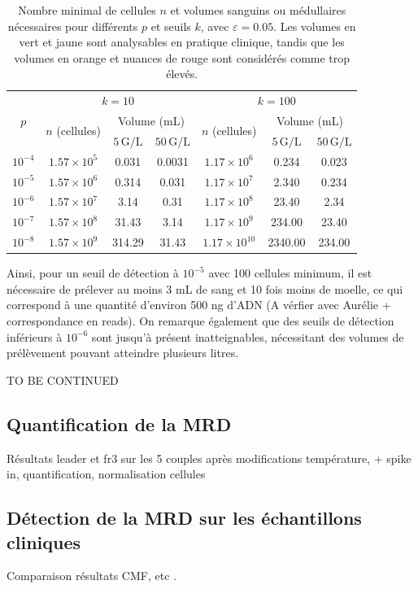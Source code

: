 \begin{table}[H]
    \centering
    \caption{
        Nombre minimal de cellules $n$ et volumes sanguins ou médullaires nécessaires pour différents $p$ et seuils $k$, avec $\varepsilon = 0.05$.
        Les volumes en \colorbox{mygreen}{vert} et \colorbox{myyellow}{jaune} sont analysables en pratique clinique, tandis que les
        volumes en \colorbox{myorange}{orange} et nuances de \colorbox{myred}{rouge} sont considérés comme trop élevés.
    }
    \label{tab:valeurs_n_volume}
    \begin{tabular}{c|c|cc|c|cc}
        \toprule
        \multirow{3}{*}{$p$} 
        & \multicolumn{3}{c|}{$k = 10$} 
        & \multicolumn{3}{c}{$k = 100$} \\
        \cmidrule(lr){2-4} \cmidrule(lr){5-7}
        & \multirow{2}{*}{$n$ (cellules)} & \multicolumn{2}{c|}{Volume (mL)} & \multirow{2}{*}{$n$ (cellules)} & \multicolumn{2}{c}{Volume (mL)} \\
        \cmidrule(lr){3-4} \cmidrule(lr){6-7}
        & & $5\,\text{G/L}$ & $50\,\text{G/L}$ & & $5\,\text{G/L}$ & $50\,\text{G/L}$ \\
        \midrule
        $10^{-4}$ & $1.57\times10^{5}$ & \cellcolor{mygreen}0.031 & \cellcolor{mygreen}0.0031 & $1.17\times10^{6}$ & \cellcolor{mygreen}0.234 & \cellcolor{mygreen}0.023 \\
        $10^{-5}$ & $1.57\times10^{6}$ & \cellcolor{mygreen}0.314 & \cellcolor{mygreen}0.031  & $1.17\times10^{7}$ & \cellcolor{myyellow}2.340 & \cellcolor{mygreen}0.234 \\
        $10^{-6}$ & $1.57\times10^{7}$ & \cellcolor{myyellow}3.14 & \cellcolor{mygreen}0.31   & $1.17\times10^{8}$ & \cellcolor{myorange}23.40 & \cellcolor{myyellow}2.34 \\
        $10^{-7}$ & $1.57\times10^{8}$ & \cellcolor{myred}31.43   & \cellcolor{myyellow}3.14  & $1.17\times10^{9}$ & \cellcolor{mydarkred}234.00 & \cellcolor{myorange}23.40 \\
        $10^{-8}$ & $1.57\times10^{9}$ & \cellcolor{mydarkred}314.29 & \cellcolor{myred}31.43 & $1.17\times10^{10}$ & \cellcolor{mydeepred}2340.00 & \cellcolor{mydarkred}234.00 \\
        \bottomrule
    \end{tabular}
\end{table}

Ainsi, pour un seuil de détection à $10^{-5}$ avec 100 cellules minimum, il est
nécessaire de prélever au moins 3 mL de sang et 10 fois moins de moelle, ce qui
correspond à une quantité d'environ 500 ng d'ADN (A vérfier avec Aurélie +
correspondance en reads). On remarque également que des seuils de détection
inférieurs à $10^{-6}$ sont jusqu'à présent inatteignables, nécessitant des
volumes de prélèvement pouvant atteindre plusieurs litres.

TO BE CONTINUED

\subsection{Quantification de la MRD}

Résultats leader et fr3 sur les 5 couples après modifications température, +
spike in, quantification, normalisation cellules

\subsection{Détection de la MRD sur les échantillons cliniques}

Comparaison résultats CMF, etc .